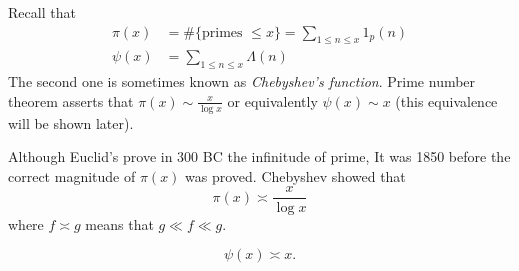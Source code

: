 \documentclass[a4paper]{article}
\theoremstyle{definition}
\begin{document}
Recall that
\begin{align*}
  \pi(x) &= \# \{\text{primes } \leq x\} = \sum_{1 \leq n \leq x} 1_p(n) \\
  \psi(x) &= \sum_{1 \leq n \leq x} \Lambda(n)
\end{align*}
The second one is sometimes known as \emph{Chebyshev's function}. Prime number theorem asserts that \(\pi(x) \sim \frac{x}{\log x}\) or equivalently \(\psi(x) \sim x\) (this equivalence will be shown later).

Although Euclid's prove in 300 BC the infinitude of prime, It was 1850 before the correct magnitude of \(\pi(x)\) was proved. Chebyshev showed that
\[
  \pi(x) \asymp \frac{x}{\log x}
\]
where \(f \asymp g\) means that \(g \ll f \ll g\).

\begin{theorem}[Chebyshev]
  \[
    \psi(x) \asymp x.
  \]
\end{theorem}
\end{document}

